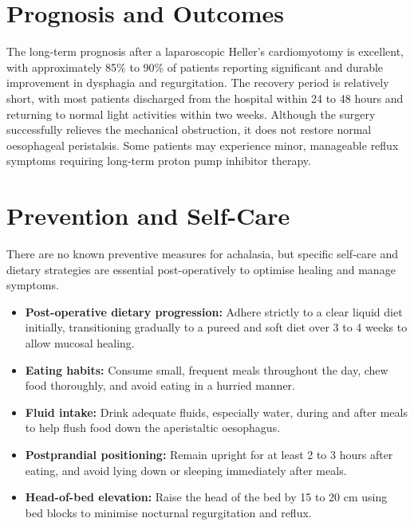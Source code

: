 \section*{Prognosis and Outcomes}
The long-term prognosis after a laparoscopic Heller's cardiomyotomy is excellent, with approximately 85\% to 90\% of patients reporting significant and durable improvement in dysphagia and regurgitation. The recovery period is relatively short, with most patients discharged from the hospital within 24 to 48 hours and returning to normal light activities within two weeks. Although the surgery successfully relieves the mechanical obstruction, it does not restore normal oesophageal peristalsis. Some patients may experience minor, manageable reflux symptoms requiring long-term proton pump inhibitor therapy.

\section*{Prevention and Self-Care}
There are no known preventive measures for achalasia, but specific self-care and dietary strategies are essential post-operatively to optimise healing and manage symptoms.
\begin{itemize}
    \item \textbf{Post-operative dietary progression:} Adhere strictly to a clear liquid diet initially, transitioning gradually to a pureed and soft diet over 3 to 4 weeks to allow mucosal healing.
    \item \textbf{Eating habits:} Consume small, frequent meals throughout the day, chew food thoroughly, and avoid eating in a hurried manner.
    \item \textbf{Fluid intake:} Drink adequate fluids, especially water, during and after meals to help flush food down the aperistaltic oesophagus.
    \item \textbf{Postprandial positioning:} Remain upright for at least 2 to 3 hours after eating, and avoid lying down or sleeping immediately after meals.
    \item \textbf{Head-of-bed elevation:} Raise the head of the bed by 15 to 20 cm using bed blocks to minimise nocturnal regurgitation and reflux.
\end{itemize}

